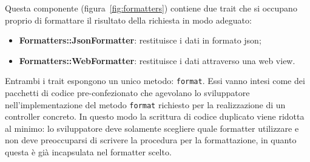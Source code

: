 Questa componente (figura~\ref{fig:formatters}) contiene due \gls{trait}\glsfirstoccur{} che si occupano proprio di formattare il risultato della richiesta in modo adeguato:
\begin{itemize}
	\item \textbf{Formatters::JsonFormatter}: restituisce i dati in formato \gls{json}\glsfirstoccur{};
	\item \textbf{Formatters::WebFormatter}: restituisce i dati attraverso una web view.
\end{itemize}

Entrambi i \gls{trait}\glsfirstoccur{} espongono un unico metodo: \verb!format!. Essi vanno intesi come dei pacchetti di codice pre-confezionato che agevolano lo sviluppatore nell'implementazione del metodo \verb!format! richiesto per la realizzazione di un controller concreto. In questo modo la scrittura di codice duplicato viene ridotta al minimo: lo sviluppatore deve solamente scegliere quale formatter utilizzare e non deve preoccuparsi di scrivere la procedura per la formattazione, in quanto questa è già incapsulata nel formatter scelto.




